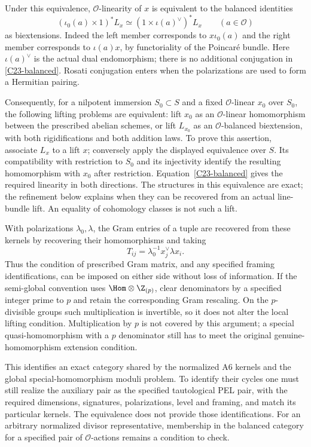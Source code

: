 Under this equivalence, $\mathcal O$-linearity of $x$ is
equivalent to the balanced identities
\begin{equation}\label{C23-balanced}
 (\iota_0(a)\times1)^*L_x
       \simeq(1\times\iota(a)^\vee)^*L_x
                         \qquad(a\in\mathcal O)
\end{equation}
as biextensions.  Indeed the left member corresponds to
$x\iota_0(a)$ and the right member corresponds to
$\iota(a)x$, by functoriality of the Poincar\'e bundle.
Here $\iota(a)^\vee$ is the actual dual endomorphism;
there is no additional conjugation in
\eqref{C23-balanced}.  Rosati conjugation enters when the
polarizations are used to form a Hermitian pairing.

Consequently, for a nilpotent immersion $S_0\subset S$
and a fixed $\mathcal O$-linear $x_0$ over $S_0$, the
following lifting problems are equivalent: lift $x_0$ as an
$\mathcal O$-linear homomorphism between the prescribed
abelian schemes, or lift $L_{x_0}$ as an $\mathcal O$-balanced
biextension, with both rigidifications and both addition
laws.  To prove this assertion, associate $L_x$ to a lift
$x$; conversely apply the displayed equivalence over $S$.
Its compatibility with restriction to $S_0$ and its
injectivity identify the resulting homomorphism with $x_0$
after restriction.  Equation~\eqref{C23-balanced} gives
the required linearity in both directions.  The structures
in this equivalence are exact; the refinement below explains
when they can be recovered from an actual line-bundle lift.
An equality of cohomology classes is not such a lift.

With polarizations $\lambda_0,\lambda$, the Gram entries
of a tuple are recovered from these kernels by recovering
their homomorphisms and taking
\[
           T_{ij}=\lambda_0^{-1}x_j^\vee\lambda x_i.
\]
Thus the condition of prescribed Gram matrix, and any
specified framing identifications, can be imposed on
either side without loss of information.  If the
semi-global convention uses $\Hom\otimes\Z_{(p)}$, clear
denominators by a specified integer prime to $p$ and retain
the corresponding Gram rescaling.  On the $p$-divisible
groups such multiplication is invertible, so it does not
alter the local lifting condition.  Multiplication by $p$
is not covered by this argument; a special
quasi-homomorphism with a $p$ denominator still has to meet
the original genuine-homomorphism extension condition.

This identifies an exact category shared by the normalized
A6 kernels and the global special-homomorphism moduli
problem.  To identify their cycles one must still realize
the auxiliary pair as the specified tautological PEL pair,
with the required dimensions, signatures, polarizations,
level and framing, and match its particular kernels.
The equivalence does not provide those identifications.
For an arbitrary normalized divisor representative,
membership in the balanced category for a specified pair of
$\mathcal O$-actions remains a condition to check.


